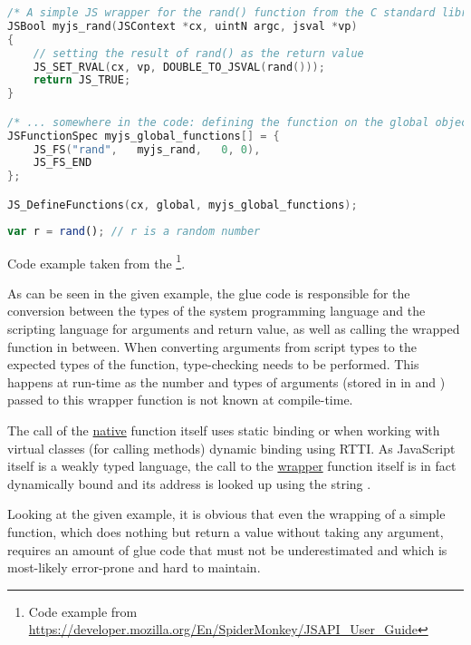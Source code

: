 \SingleSpacing
\begin{lstlisting}[language=C++, caption=Exposing a \myProperName{C} function to \myProperName{SpiderMonkey}]
/* A simple JS wrapper for the rand() function from the C standard library */
JSBool myjs_rand(JSContext *cx, uintN argc, jsval *vp)
{
    // setting the result of rand() as the return value
    JS_SET_RVAL(cx, vp, DOUBLE_TO_JSVAL(rand()));
    return JS_TRUE;
}

/* ... somewhere in the code: defining the function on the global object so it can be used from the script */
JSFunctionSpec myjs_global_functions[] = {
    JS_FS("rand",   myjs_rand,   0, 0),
    JS_FS_END
};

JS_DefineFunctions(cx, global, myjs_global_functions);
\end{lstlisting}
\OnehalfSpacing

\SingleSpacing
\begin{lstlisting}[language=JavaScript, caption=Using a \myProperName{C} function from \myProperName{SpiderMonkey}]
var r = rand();	// r is a random number
\end{lstlisting}
\OnehalfSpacing

Code example taken from the \footnote{Code example from \url{https://developer.mozilla.org/En/SpiderMonkey/JSAPI_User_Guide}}.

As can be seen in the given example, the glue code is responsible for the conversion between the types of the system programming language and the scripting language for arguments and return value, as well as calling the wrapped function in between. When converting arguments from script types to the expected types of the function, type-checking needs to be performed. This happens at run-time as the number and types of arguments (stored in in  and ) passed to this wrapper function is not known at compile-time.

The call of the \underline{native} function  itself uses static binding or when working with virtual classes (for calling methods) dynamic binding using RTTI. As JavaScript itself is a weakly typed language, the call to the \underline{wrapper} function  itself is in fact dynamically bound and its address is looked up using the string .

Looking at the given example, it is obvious that even the wrapping of a simple  function, which does nothing but return a  value without taking any argument, requires an amount of glue code that must not be underestimated and which is most-likely error-prone and hard to maintain.

